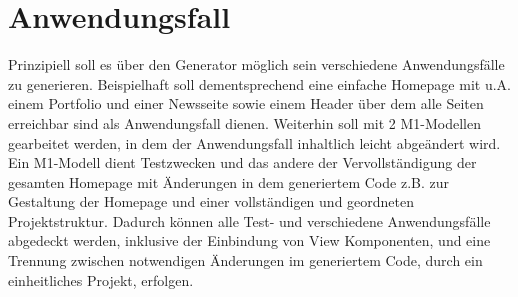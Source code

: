 \section{Anwendungsfall}
\label{Anwendungsfall}
Prinzipiell soll es über den Generator möglich sein verschiedene Anwendungsfälle
zu generieren. Beispielhaft soll dementsprechend eine
einfache Homepage mit u.A.
einem Portfolio und einer Newsseite sowie einem Header über dem alle Seiten
erreichbar sind als Anwendungsfall dienen. Weiterhin soll mit 2
M1-Modellen gearbeitet werden, in dem der Anwendungsfall inhaltlich leicht abgeändert wird.
Ein M1-Modell dient Testzwecken und das andere der Vervollständigung der
gesamten Homepage mit Änderungen in dem generiertem Code z.B. zur Gestaltung der
Homepage und einer vollständigen und geordneten Projektstruktur.
Dadurch können alle Test- und verschiedene Anwendungsfälle abgedeckt werden,
inklusive der Einbindung von View Komponenten, und eine Trennung zwischen notwendigen Änderungen im
generiertem Code, durch ein einheitliches Projekt, erfolgen.